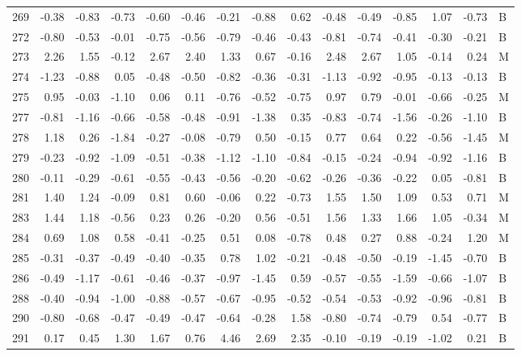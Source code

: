 \begin{table}[ht]
\begin{tabular}{rrrrrrrrrrrrrrl}
  269 & -0.38 & -0.83 & -0.73 & -0.60 & -0.46 & -0.21 & -0.88 & 0.62 & -0.48 & -0.49 & -0.85 & 1.07 & -0.73 & B \\ 
  272 & -0.80 & -0.53 & -0.01 & -0.75 & -0.56 & -0.79 & -0.46 & -0.43 & -0.81 & -0.74 & -0.41 & -0.30 & -0.21 & B \\ 
  273 & 2.26 & 1.55 & -0.12 & 2.67 & 2.40 & 1.33 & 0.67 & -0.16 & 2.48 & 2.67 & 1.05 & -0.14 & 0.24 & M \\ 
  274 & -1.23 & -0.88 & 0.05 & -0.48 & -0.50 & -0.82 & -0.36 & -0.31 & -1.13 & -0.92 & -0.95 & -0.13 & -0.13 & B \\ 
  275 & 0.95 & -0.03 & -1.10 & 0.06 & 0.11 & -0.76 & -0.52 & -0.75 & 0.97 & 0.79 & -0.01 & -0.66 & -0.25 & M \\ 
  277 & -0.81 & -1.16 & -0.66 & -0.58 & -0.48 & -0.91 & -1.38 & 0.35 & -0.83 & -0.74 & -1.56 & -0.26 & -1.10 & B \\ 
  278 & 1.18 & 0.26 & -1.84 & -0.27 & -0.08 & -0.79 & 0.50 & -0.15 & 0.77 & 0.64 & 0.22 & -0.56 & -1.45 & M \\ 
  279 & -0.23 & -0.92 & -1.09 & -0.51 & -0.38 & -1.12 & -1.10 & -0.84 & -0.15 & -0.24 & -0.94 & -0.92 & -1.16 & B \\ 
  280 & -0.11 & -0.29 & -0.61 & -0.55 & -0.43 & -0.56 & -0.20 & -0.62 & -0.26 & -0.36 & -0.22 & 0.05 & -0.81 & B \\ 
  281 & 1.40 & 1.24 & -0.09 & 0.81 & 0.60 & -0.06 & 0.22 & -0.73 & 1.55 & 1.50 & 1.09 & 0.53 & 0.71 & M \\ 
  283 & 1.44 & 1.18 & -0.56 & 0.23 & 0.26 & -0.20 & 0.56 & -0.51 & 1.56 & 1.33 & 1.66 & 1.05 & -0.34 & M \\ 
  284 & 0.69 & 1.08 & 0.58 & -0.41 & -0.25 & 0.51 & 0.08 & -0.78 & 0.48 & 0.27 & 0.88 & -0.24 & 1.20 & M \\ 
  285 & -0.31 & -0.37 & -0.49 & -0.40 & -0.35 & 0.78 & 1.02 & -0.21 & -0.48 & -0.50 & -0.19 & -1.45 & -0.70 & B \\ 
  286 & -0.49 & -1.17 & -0.61 & -0.46 & -0.37 & -0.97 & -1.45 & 0.59 & -0.57 & -0.55 & -1.59 & -0.66 & -1.07 & B \\ 
  288 & -0.40 & -0.94 & -1.00 & -0.88 & -0.57 & -0.67 & -0.95 & -0.52 & -0.54 & -0.53 & -0.92 & -0.96 & -0.81 & B \\ 
  290 & -0.80 & -0.68 & -0.47 & -0.49 & -0.47 & -0.64 & -0.28 & 1.58 & -0.80 & -0.74 & -0.79 & 0.54 & -0.77 & B \\ 
  291 & 0.17 & 0.45 & 1.30 & 1.67 & 0.76 & 4.46 & 2.69 & 2.35 & -0.10 & -0.19 & -0.19 & -1.02 & 0.21 & B \\ 

\end{tabular}
\end{table}
